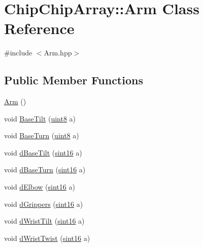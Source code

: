 \hypertarget{classChipChipArray_1_1Arm}{\section{Chip\+Chip\+Array\+:\+:Arm Class Reference}
\label{classChipChipArray_1_1Arm}
}


{\ttfamily \#include $<$Arm.\+hpp$>$}

\subsection*{Public Member Functions}
\begin{DoxyCompactItemize}
\item 
\hyperlink{classChipChipArray_1_1Arm_aeda43d8461e50eaca9aa891ee2863c05}{Arm} ()
\item 
void \hyperlink{classChipChipArray_1_1Arm_a8b077a3791d9fc5ef285c1520fe4c5d8}{Base\+Tilt} (\hyperlink{definitions_8hpp_adde6aaee8457bee49c2a92621fe22b79}{uint8} a)
\item 
void \hyperlink{classChipChipArray_1_1Arm_addaedfe85ff2b14ff00c344fc4b40cd6}{Base\+Turn} (\hyperlink{definitions_8hpp_adde6aaee8457bee49c2a92621fe22b79}{uint8} a)
\item 
void \hyperlink{classChipChipArray_1_1Arm_af84b91c664baec0f2882dcf4089ae027}{d\+Base\+Tilt} (\hyperlink{definitions_8hpp_a74df79fde3c518e55b29ce6360a9c76e}{sint16} a)
\item 
void \hyperlink{classChipChipArray_1_1Arm_a980f5bd278cbe06aa21754fb8e0324b3}{d\+Base\+Turn} (\hyperlink{definitions_8hpp_a74df79fde3c518e55b29ce6360a9c76e}{sint16} a)
\item 
void \hyperlink{classChipChipArray_1_1Arm_ae8d0a664dd1a0e556cf40c0984035163}{d\+Elbow} (\hyperlink{definitions_8hpp_a74df79fde3c518e55b29ce6360a9c76e}{sint16} a)
\item 
void \hyperlink{classChipChipArray_1_1Arm_a2e46473723c15e88952a2c4fbd0a8bd8}{d\+Grippers} (\hyperlink{definitions_8hpp_a74df79fde3c518e55b29ce6360a9c76e}{sint16} a)
\item 
void \hyperlink{classChipChipArray_1_1Arm_a43daba698f13a522887ad022b78557bb}{d\+Wrist\+Tilt} (\hyperlink{definitions_8hpp_a74df79fde3c518e55b29ce6360a9c76e}{sint16} a)
\item 
void \hyperlink{classChipChipArray_1_1Arm_a6bde822b1be63926e21222f36aad67b3}{d\+Wrist\+Twist} (\hyperlink{definitions_8hpp_a74df79fde3c518e55b29ce6360a9c76e}{sint16} a)
\item 

\end{DoxyCompactItemize}

